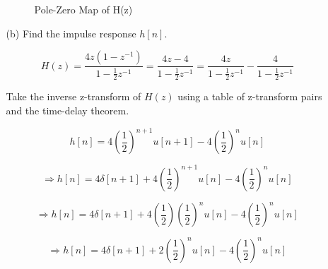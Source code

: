 \documentclass[fleqn]{article}
\begin{document}
\begin{enumerate}[nolistsep]
\begin{enumerate}[nolistsep]
						\begin{figure}[H]				
						\centerline{}
						\caption{Pole-Zero Map of H(z)}
						\label{pzmap_prob_3_40}
						\end{figure}
						
					\item[(b)] Find the impulse response $h[n]$.
					
						\begin{equation*}
							H(z) = \frac{4z(1 - z^{-1})}{1 - \frac{1}{2}z^{-1}} = \frac{4z - 4}{1 - \frac{1}{2}z^{-1}} = \frac{4z}{1 - \frac{1}{2}z^{-1}} - \frac{4}{1 - \frac{1}{2}z^{-1}}
						\end{equation*}
						
						Take the inverse z-transform of $H(z)$ using a table of z-transform pairs and the time-delay theorem.
						
						\begin{equation*}
							h[n] = 4\left(\frac{1}{2}\right)^{n+1}u[n+1] - 4\left(\frac{1}{2}\right)^{n}u[n]
						\end{equation*}
						
						\begin{equation*}
							\Rightarrow h[n] = 4\delta[n+1] + 4\left(\frac{1}{2}\right)^{n+1}u[n] - 4\left(\frac{1}{2}\right)^{n}u[n]
						\end{equation*}
						
						\begin{equation*}
							\Rightarrow h[n] = 4\delta[n+1] + 4\left(\frac{1}{2}\right)\left(\frac{1}{2}\right)^{n}u[n] - 4\left(\frac{1}{2}\right)^{n}u[n]
						\end{equation*}
						
						\begin{equation*}
							\Rightarrow h[n] = 4\delta[n+1] + 2\left(\frac{1}{2}\right)^{n}u[n] - 4\left(\frac{1}{2}\right)^{n}u[n]
						\end{equation*}
						

\end{enumerate}
\end{enumerate}
\end{document}
